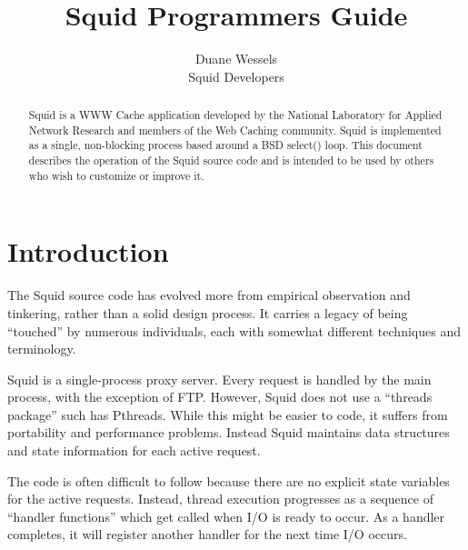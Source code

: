 
\newenvironment{SS}{\singlespace}{}





\author{Duane Wessels\\
Squid Developers}
\title{Squid Programmers Guide}

\maketitle

\begin{abstract}
Squid is a WWW Cache application developed by the National Laboratory
for Applied Network Research and members of the Web Caching community.
Squid is implemented as a single, non-blocking process based around
a BSD select() loop.  This document describes the operation of the Squid
source code and is intended to be used by others who wish to customize
or improve it.
\end{abstract}

\chapter{Introduction}

The Squid source code has evolved more from empirical observation and
tinkering, rather than a solid design process.  It carries a legacy of
being ``touched'' by numerous individuals, each with somewhat different
techniques and terminology.  

Squid is a single-process proxy server.  Every request is handled by
the main process, with the exception of FTP.  However, Squid does not
use a ``threads package'' such has Pthreads.  While this might be 
easier to code, it suffers from portability and performance problems.
Instead Squid maintains data structures and state information for
each active request.

The code is often difficult to follow because there are no explicit
state variables for the active requests.  Instead, thread execution
progresses as a sequence of ``handler functions'' which get called
when I/O is ready to occur.  As a handler completes, it will register
another handler for the next time I/O occurs.

